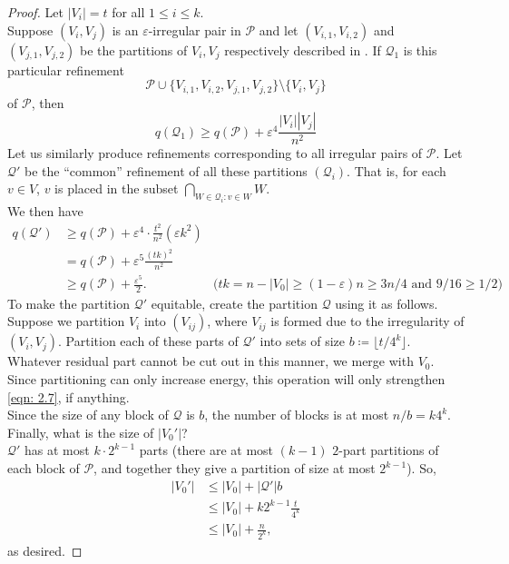 \documentclass{article}
\begin{document}
			\begin{proof}
				Let $|V_i| = t$ for all $1\le i\le k$.\\
				Suppose $(V_i,V_j)$ is an $\varepsilon$-irregular pair in $\mathcal{P}$ and let $(V_{i,1},V_{i,2})$ and $(V_{j,1},V_{j,2})$ be the partitions of $V_i,V_j$ respectively described in . If $\mathcal{Q}_1$ is this particular refinement
				\[ \mathcal{P} \cup \{V_{i,1},V_{i,2},V_{j,1},V_{j,2}\} \setminus \{V_i,V_j\} \]
				of $\mathcal{P}$, then
				\[ q(\mathcal{Q}_1) \ge q(\mathcal{P}) + \varepsilon^4 \frac{|V_i||V_j|}{n^2} \]
				Let us similarly produce refinements corresponding to all irregular pairs of $\mathcal{P}$. Let $\mathcal{Q}'$ be the ``common'' refinement of all these partitions $(\mathcal{Q}_i)$. That is, for each $v \in V$, $v$ is placed in the subset $\bigcap_{W \in \mathcal{Q}_i : v \in W} W$.\\
				We then have
				\begin{align}
					q(\mathcal{Q}') &\ge q(\mathcal{P}) + \varepsilon^4 \cdot \frac{t^2}{n^2} (\varepsilon k^2) \nonumber \\
					&= q(\mathcal{P}) + \varepsilon^5 \frac{(tk)^2}{n^2} \nonumber \\
					&\ge q(\mathcal{P}) + \frac{\varepsilon^5}{2}. & \text{($tk = n - |V_0| \ge (1-\varepsilon)n \ge 3n/4$ and $9/16 \ge 1/2$)} \label{eqn: 2.7}
				\end{align}
				To make the partition $\mathcal{Q}'$ equitable, create the partition $\mathcal{Q}$ using it as follows.\\
				Suppose we partition $V_i$ into $(V_{ij})$, where $V_{ij}$ is formed due to the irregularity of $(V_i,V_j)$. Partition each of these parts of $\mathcal{Q}'$ into sets of size $b\coloneqq \lfloor t/4^k\rfloor$. Whatever residual part cannot be cut out in this manner, we merge with $V_0$.\\
				Since partitioning can only increase energy, this operation will only strengthen \eqref{eqn: 2.7}, if anything.\\

				Since the size of any block of $\mathcal{Q}$ is $b$, the number of blocks is at most $n/b = k 4^k$.\\
				Finally, what is the size of $|V_0'|$?\\
				$\mathcal{Q}'$ has at most $k\cdot 2^{k-1}$ parts (there are at most $(k-1)$ $2$-part partitions of each block of $\mathcal{P}$, and together they give a partition of size at most $2^{k-1}$). So,\\
				\begin{align*}
					|V_0'| &\le |V_0| + |\mathcal{Q}'| b \\
					&\le |V_0| + k 2^{k-1} \frac{t}{4^k} \\
					&\le |V_0| + \frac{n}{2^k},
				\end{align*}
				as desired.
			\end{proof}







\end{document}
